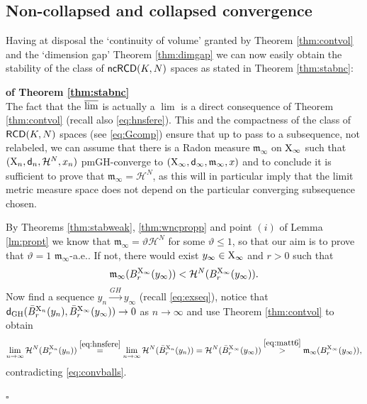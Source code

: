 \documentclass[reqno,11pt]{article}
\numberwithin{equation}{section}
\newcommand{\mm}{{\mbox{\boldmath$m$}}}
\newcommand{\sfd}{{\sf d}}
\newcommand{\lims}{\varlimsup}
\renewcommand{\mm}{\mathfrak m}                                %
\newenvironment{proofb}{\removelastskip\par\medskip   %
\noindent{\em{\bf Proof}} \rm}{\penalty-20\null\hfill$\square$\par\medbreak}
\newcommand{\X}{{\rm X}}
\newcommand{\RCD}{{\sf RCD}}
\newcommand{\ncRCD}{{\sf ncRCD}}
\newcommand{\HH}{{\mathcal H}}
\begin{document}
\subsection{Non-collapsed and collapsed convergence}
Having at disposal the `continuity of volume' granted by Theorem \ref{thm:contvol} and the `dimension gap' Theorem \ref{thm:dimgap} we can now easily obtain the stability of the class of $\ncRCD(K,N)$ spaces as stated in Theorem \ref{thm:stabnc}:
\begin{proofb}{\bf of Theorem \ref{thm:stabnc}} \\
 The fact that the $\lims$ is actually a $\lim$ is a direct consequence of Theorem  \ref{thm:contvol}  (recall also \eqref{eq:hnsfere}).  This and the compactness of the class of $\RCD(K,N)$ spaces (see \eqref{eq:Gcomp}) ensure that up to pass to a subsequence, not relabeled, we can assume that there is a Radon measure $\mm_\infty$ on $\X_\infty$ such that $(\X_{n},\sfd_{n},\HH^N,x_{n})$ pmGH-converge to $(\X_\infty,\sfd_\infty,\mm_\infty,x)$ and to conclude it is sufficient to prove that $\mm_\infty=\HH^N$, as this will in particular imply that the limit { metric measure } space does not depend on the particular converging subsequence chosen.

By Theorems  \ref{thm:stabweak}, \ref{thm:wncpropp} and point $(i)$ of Lemma \ref{lm:propt} we  know that $\mm_\infty=\vartheta\HH^N$ for some $\vartheta\leq 1$, so that our aim is to prove that $\vartheta=1$ $\mm_\infty$-a.e.. If not, there would exist $y_\infty\in\X_\infty$ and $r>0$ such that
\begin{equation}
\label{eq:matt6}
\mm_\infty(B_r^{\X_\infty}(y_\infty))<\HH^N(B_r^{\X_\infty}(y_\infty)).
\end{equation}
Now find a  sequence $y_n\stackrel{GH}\to y_\infty$ (recall \eqref{eq:exseq}), notice that  $\sfd_{\rm GH}(\bar B_r^{\X_n}(y_n),\bar B_r^{\X_\infty}(y_\infty))\to 0$ as $n\to\infty$ and use Theorem \ref{thm:contvol} to  obtain
\[
\lim_{n\to\infty}\HH^N( B_r^{\X_n}(y_n))\stackrel{\eqref{eq:hnsfere}}=\lim_{n\to\infty}\HH^N(\bar B_r^{\X_n}(y_n))=\HH^N(\bar B_r^{\X_\infty}(y_\infty))\stackrel{\eqref{eq:matt6}}>\mm_\infty(B_r^{\X_\infty}(y_\infty)),
\]
contradicting \eqref{eq:convballs}.


\end{proofb}
\end{document}
